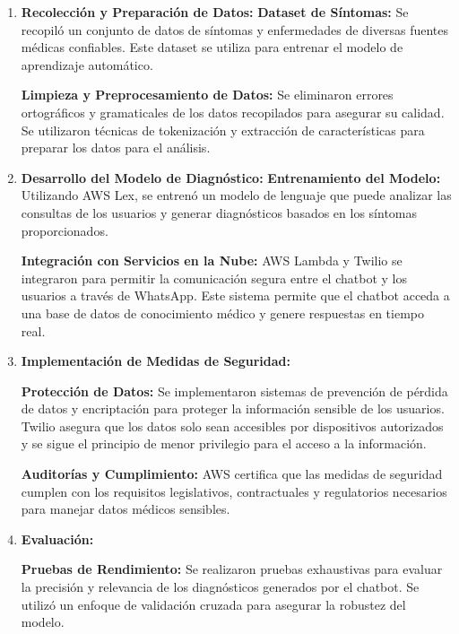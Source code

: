 \begin{enumerate}
	
	\item \textbf{Recolección y Preparación de Datos:}
		\subitem \textbf{Dataset de Síntomas:} Se recopiló un conjunto de datos de síntomas y enfermedades de diversas fuentes médicas confiables. Este dataset se utiliza para entrenar el modelo de aprendizaje automático.
	
		\subitem \textbf{Limpieza y Preprocesamiento de Datos:} Se eliminaron errores ortográficos y gramaticales de los datos recopilados para asegurar su calidad. Se utilizaron técnicas de tokenización y extracción de características para preparar los datos para el análisis.
	
	\item \textbf{Desarrollo del Modelo de Diagnóstico:}
		\subitem \textbf{Entrenamiento del Modelo:} Utilizando AWS Lex, se entrenó un modelo de lenguaje que puede analizar las consultas de los usuarios y generar diagnósticos basados en los síntomas proporcionados.
		
		\subitem \textbf{Integración con Servicios en la Nube:} AWS Lambda y Twilio se integraron para permitir la comunicación segura entre el chatbot y los usuarios a través de WhatsApp. Este sistema permite que el chatbot acceda a una base de datos de conocimiento médico y genere respuestas en tiempo real.
	
	\item \textbf{Implementación de Medidas de Seguridad:}
	
		\subitem \textbf{Protección de Datos:} Se implementaron sistemas de prevención de pérdida de datos y encriptación para proteger la información sensible de los usuarios. Twilio asegura que los datos solo sean accesibles por dispositivos autorizados y se sigue el principio de menor privilegio para el acceso a la información.
		
		\subitem \textbf{Auditorías y Cumplimiento:} AWS certifica que las medidas de seguridad cumplen con los requisitos legislativos, contractuales y regulatorios necesarios para manejar datos médicos sensibles.
	
	
	\item \textbf{Evaluación:}
		
		\subitem \textbf{Pruebas de Rendimiento:} Se realizaron pruebas exhaustivas para evaluar la precisión y relevancia de los diagnósticos generados por el chatbot. Se utilizó un enfoque de validación cruzada para asegurar la robustez del modelo.
		

		
\end{enumerate}

